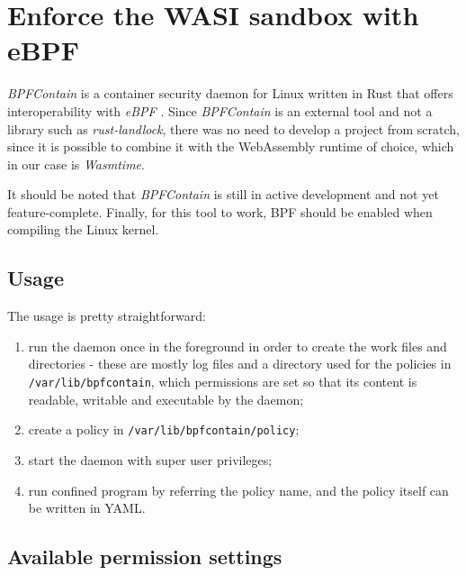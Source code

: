 \section{Enforce the WASI sandbox with eBPF}

\textit{BPFContain} \cite{bpfcontain} is a container security daemon for Linux written in Rust that offers
interoperability with \textit{eBPF} \cite{ebpf}.
Since \textit{BPFContain} is an external tool and not a library such as \textit{rust-landlock}, there was no need
to develop a project from scratch, since it is possible to combine it with the WebAssembly runtime of choice, which
in our case is \textit{Wasmtime}.

It should be noted that \textit{BPFContain} is still in active development and not yet feature-complete.
Finally, for this tool to work, BPF should be enabled when compiling the Linux kernel.

\subsection{Usage}

The usage is pretty straightforward:
\begin{enumerate}
  \item run the daemon once in the foreground in order to create the work files and directories -
        these are mostly log files and a directory used for the policies in \texttt{/var/lib/bpfcontain},
        which permissions are set so that its content is readable, writable and executable by the daemon;
  \item create a policy in \texttt{/var/lib/bpfcontain/policy};
  \item start the daemon with super user privileges;
  \item run confined program by referring the policy name, and the policy itself can be written in YAML.
\end{enumerate}

\subsection{Available permission settings}

